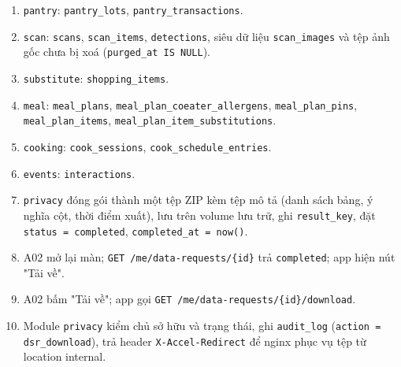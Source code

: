\begin{enumerate}
\item {\small\texttt{pantry}}: {\small\texttt{pantry\_\allowbreak{}\allowbreak{}lots}}, {\small\texttt{pantry\_\allowbreak{}\allowbreak{}transactions}}.
\item {\small\texttt{scan}}: {\small\texttt{scans}}, {\small\texttt{scan\_\allowbreak{}\allowbreak{}items}}, {\small\texttt{detections}}, siêu dữ liệu {\small\texttt{scan\_\allowbreak{}\allowbreak{}images}} và tệp ảnh gốc chưa bị xoá ({\small\texttt{purged\_\allowbreak{}\allowbreak{}at IS NULL}}).
\item {\small\texttt{substitute}}: {\small\texttt{shopping\_\allowbreak{}\allowbreak{}items}}.
\item {\small\texttt{meal}}: {\small\texttt{meal\_\allowbreak{}\allowbreak{}plans}}, {\small\texttt{meal\_\allowbreak{}\allowbreak{}plan\_\allowbreak{}\allowbreak{}coeater\_\allowbreak{}\allowbreak{}allergens}}, {\small\texttt{meal\_\allowbreak{}\allowbreak{}plan\_\allowbreak{}\allowbreak{}pins}}, {\small\texttt{meal\_\allowbreak{}\allowbreak{}plan\_\allowbreak{}\allowbreak{}items}}, {\small\texttt{meal\_\allowbreak{}\allowbreak{}plan\_\allowbreak{}\allowbreak{}item\_\allowbreak{}\allowbreak{}substitutions}}.
\item {\small\texttt{cooking}}: {\small\texttt{cook\_\allowbreak{}\allowbreak{}sessions}}, {\small\texttt{cook\_\allowbreak{}\allowbreak{}schedule\_\allowbreak{}\allowbreak{}entries}}.
\item {\small\texttt{events}}: {\small\texttt{interactions}}.
\item {\small\texttt{privacy}} đóng gói thành một tệp ZIP kèm tệp mô tả (danh sách bảng, ý nghĩa cột, thời điểm xuất), lưu trên volume lưu trữ, ghi {\small\texttt{result\_\allowbreak{}\allowbreak{}key}}, đặt {\small\texttt{status = completed}}, {\small\texttt{completed\_\allowbreak{}\allowbreak{}at = now()}}.
\item A02 mở lại màn; {\small\texttt{GET /\allowbreak{}\allowbreak{}me/\allowbreak{}\allowbreak{}data-\allowbreak{}requests/\allowbreak{}\allowbreak{}\{id\}}} trả {\small\texttt{completed}}; app hiện nút "Tải về".
\item A02 bấm "Tải về"; app gọi {\small\texttt{GET /\allowbreak{}\allowbreak{}me/\allowbreak{}\allowbreak{}data-\allowbreak{}requests/\allowbreak{}\allowbreak{}\{id\}/\allowbreak{}\allowbreak{}download}}.
\item Module {\small\texttt{privacy}} kiểm chủ sở hữu và trạng thái, ghi {\small\texttt{audit\_\allowbreak{}\allowbreak{}log}} ({\small\texttt{action = dsr\_\allowbreak{}\allowbreak{}download}}), trả header {\small\texttt{X-\allowbreak{}Accel-\allowbreak{}Redirect}} để nginx phục vụ tệp từ location internal.
\end{enumerate}

